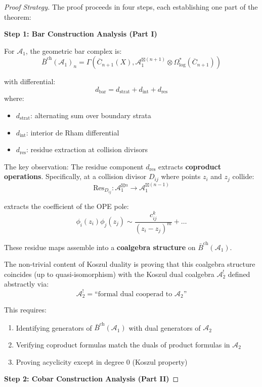 \begin{proof}[Proof Strategy]
The proof proceeds in four steps, each establishing one part of the theorem:

\textbf{Step 1: Bar Construction Analysis (Part I)}

For $\mathcal{A}_1$, the geometric bar complex is:
$$\bar{B}^{\text{ch}}(\mathcal{A}_1)_n = \Gamma\left(\overline{C}_{n+1}(X), 
   \mathcal{A}_1^{\boxtimes (n+1)} \otimes \Omega^*_{\log}(\overline{C}_{n+1})\right)$$

with differential:
$$d_{\text{bar}} = d_{\text{strat}} + d_{\text{int}} + d_{\text{res}}$$
where:
\begin{itemize}
\item $d_{\text{strat}}$: alternating sum over boundary strata
\item $d_{\text{int}}$: interior de Rham differential
\item $d_{\text{res}}$: residue extraction at collision divisors
\end{itemize}

The key observation: The residue component $d_{\text{res}}$ extracts \textbf{coproduct 
operations}. Specifically, at a collision divisor $D_{ij}$ where points $z_i$ and $z_j$ collide:
$$\text{Res}_{D_{ij}}: \mathcal{A}_1^{\boxtimes n} \to \mathcal{A}_1^{\boxtimes (n-1)}$$

extracts the coefficient of the OPE pole:
$$\phi_i(z_i)\phi_j(z_j) \sim \frac{c_{ij}^k}{(z_i - z_j)^m} + \ldots$$

These residue maps assemble into a \textbf{coalgebra structure} on $\bar{B}^{\text{ch}}(\mathcal{A}_1)$.

The non-trivial content of Koszul duality is proving that this coalgebra structure 
coincides (up to quasi-isomorphism) with the Koszul dual coalgebra $\mathcal{A}_2^!$ 
defined abstractly via:
$$\mathcal{A}_2^! = \text{``formal dual cooperad to } \mathcal{A}_2\text{''}$$

This requires:
\begin{enumerate}
\item Identifying generators of $\bar{B}^{\text{ch}}(\mathcal{A}_1)$ with dual generators 
      of $\mathcal{A}_2$
\item Verifying coproduct formulas match the duals of product formulas in $\mathcal{A}_2$
\item Proving acyclicity except in degree 0 (Koszul property)
\end{enumerate}

\textbf{Step 2: Cobar Construction Analysis (Part II)}


\end{proof}
